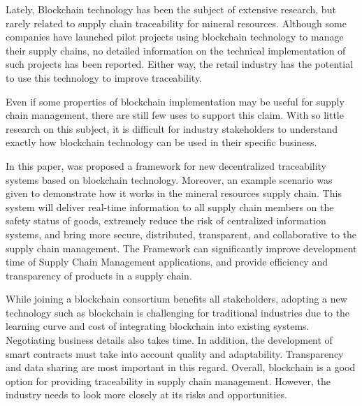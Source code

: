 \acresetall 
\label{chap:conclusion}

Lately, Blockchain technology has been the subject of extensive research, but rarely related to supply chain traceability for mineral resources. Although some companies have launched pilot projects using blockchain technology to manage their supply chains, no detailed information on the technical implementation of such projects has been reported. Either way, the retail industry has the potential to use this technology to improve traceability.

Even if some properties of blockchain implementation may be useful for supply chain management, there are still few uses to support this claim. With so little research on this subject, it is difficult for industry stakeholders to understand exactly how blockchain technology can be used in their specific business.

In this paper, was proposed a framework for new decentralized traceability systems based on blockchain technology. Moreover, an example scenario was given to demonstrate how it works in the mineral resources supply chain. This system will deliver real-time information to all supply chain members on the safety status of goods, extremely reduce the risk of centralized information systems, and bring more secure, distributed, transparent, and collaborative to the supply chain management. The Framework can significantly improve development time of Supply Chain Management applications, and provide efficiency and transparency of products in a supply chain.

While joining a blockchain consortium benefits all stakeholders, adopting a new technology such as blockchain is challenging for traditional industries due to the learning curve and cost of integrating blockchain into existing systems. Negotiating business details also takes time. In addition, the development of smart contracts must take into account quality and adaptability. Transparency and data sharing are most important in this regard. Overall, blockchain is a good option for providing traceability in supply chain management. However, the industry needs to look more closely at its risks and opportunities.